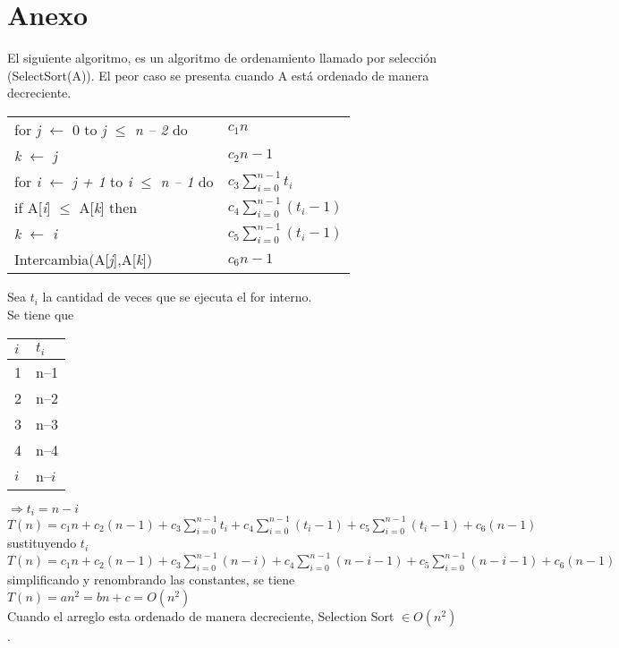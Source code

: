 \documentclass[12pt,twoside]{article}
\begin{document}
\section{Anexo}
El siguiente algoritmo, es un algoritmo de ordenamiento llamado por selección (SelectSort(A)).
El peor caso se presenta cuando A est\'{a} ordenado de manera decreciente.\\
\begin{tabular}{l l}
\hspace*{1cm}for \emph{j} $ \leftarrow$ 0 to \emph{j} $\leq$ \emph{n -- 2} do
&$c_{1}$\hspace*{0.5cm}$n$\\
\hspace*{1.5cm}\emph{k} $\leftarrow$ \emph{j}
&$c_{2}$\hspace*{0.5cm}$n-1$\\
\hspace*{1.5cm}for \emph{i} $ \leftarrow$ \emph{j + 1} to \emph{i} $\leq$ \emph{n -- 1} do
&$c_{3}$\hspace*{0.5cm}$\displaystyle\sum_{i=0}^{n-1}t_i$\\
\hspace*{2cm}if A[\emph{i}] $\leq$ A[\emph{k}] then
&$c_{4}$\hspace*{0.5cm}$\displaystyle\sum_{i=0}^{n-1}(t_i-1)$\\
\hspace*{2.5cm}\emph{k} $\leftarrow$ \emph{i}
&$c_{5}$\hspace*{0.5cm}$\displaystyle\sum_{i=0}^{n-1}(t_i-1)$\\
\hspace*{1.5cm}Intercambia(A[\emph{j}],A[\emph{k}])
&$c_{6}$\hspace*{0.5cm}$n-1$
\end{tabular}

Sea $t_i$ la cantidad de veces que se ejecuta el for interno.\\
Se tiene que\\
\begin{tabular}{l | l}
$i$& $t_i$\\
\hline
1 &n--1\\
2 &n--2\\
3 &n--3\\
4 &n--4\\
$i$ &n--$i$
\end{tabular}
$\Rightarrow t_i = n - i$\\
$T(n) = c_1n + c_2(n-1) + c_3\displaystyle\sum_{i=0}^{n-1}t_i + c_4\displaystyle\sum_{i=0}^{n-1}(t_i-1)+ c_5\displaystyle\sum_{i=0}^{n-1}(t_i-1)+ c_6(n-1)  $\\
sustituyendo $t_i$\\
$T(n) = c_1n + c_2(n-1) + c_3\displaystyle\sum_{i=0}^{n-1}(n - i) + c_4\displaystyle\sum_{i=0}^{n-1}(n - i-1)+ c_5\displaystyle\sum_{i=0}^{n-1}(n - i-1)+ c_6(n-1)  $
\\simplificando y renombrando las constantes, se tiene\\
$T(n) = an^2 = bn +c = O(n^2)$
\\Cuando el arreglo esta ordenado de manera decreciente, Selection Sort $\in O(n^2)$.
\end{document}
